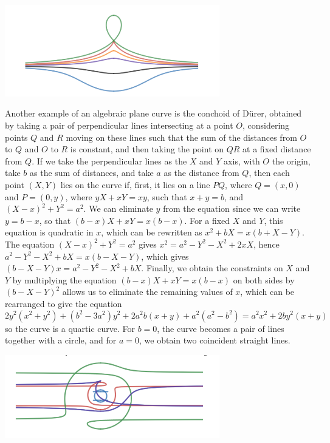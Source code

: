 \begin{example}
    \begin{center}
        \includegraphics[width=0.7\textwidth]{ConchoidDesluze}
    \end{center}
\end{example}

\begin{example}
    Another example of an algebraic plane curve is the conchoid of D\"{u}rer, obtained by taking a pair of perpendicular lines intersecting at a point $O$, considering points $Q$ and $R$ moving on these lines such that the sum of the distances from $O$ to $Q$ and $O$ to $R$ is constant, and then taking the point on $QR$ at a fixed distance from $Q$. If we take the perpendicular lines as the $X$ and $Y$ axis, with $O$ the origin, take $b$ as the sum of distances, and take $a$ as the distance from $Q$, then each point $(X,Y)$ lies on the curve if, first, it lies on a line $PQ$, where $Q = (x,0)$ and $P = (0,y)$, where $yX + xY = xy$, such that $x + y = b$, and $(X - x)^2 + Y^2 = a^2$. We can eliminate $y$ from the equation since we can write $y = b -x$, so that $(b-x)X + xY = x(b-x)$. For a fixed $X$ and $Y$, this equation is quadratic in $x$, which can be rewritten as $x^2 + bX = x(b + X - Y)$. The equation $(X - x)^2 + Y^2 = a^2$ gives $x^2 = a^2 - Y^2 - X^2 + 2xX$, hence $a^2 - Y^2 - X^2 + bX = x(b - X - Y)$, which gives $(b - X - Y)x = a^2 - Y^2 - X^2 + bX$. Finally, we obtain the constraints on $X$ and $Y$ by multiplying the equation $(b - x)X + xY = x(b - x)$ on both sides by $(b - X - Y)^2$ allows us to eliminate the remaining values of $x$, which can be rearranged to give the equation
    \[ 2y^2(x^2 + y^2) + (b^2 - 3a^2)y^2 + 2a^2b(x + y) + a^2(a^2 - b^2) = a^2x^2 + 2by^2(x + y) \]
    so the curve is a quartic curve. For $b = 0$, the curve becomes a pair of lines together with a circle, and for $a = 0$, we obtain two coincident straight lines.
    \begin{center}
        \includegraphics[width=0.7\textwidth]{ConchoidDurer}
    \end{center}
\end{example}


